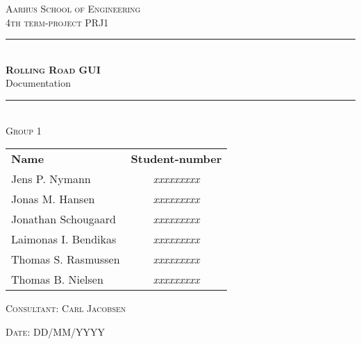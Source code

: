 \newcommand{\HRule}{\rule{\linewidth}{0.1mm}} %

\begin{center}
	
	\textsc{\LARGE Aarhus School of Engineering}\\[1.5cm] %
	
	\textsc{\large 4th term-project PRJ1}\\[2.5cm] 
	\HRule \\[0.8cm]
	{\huge \bfseries \textsc{Rolling Road GUI}} \\[0.5cm]{\LARGE Documentation} \\[0.4cm]
	\HRule \\[1.5cm]
	
	\textsc{\large Group 1}\\
	\vspace{0.5 in}
	\begin{center}
		\begin{tabular}{l c}
			\textbf{Name} & \textbf{Student-number} \\
			Jens P. Nymann & \textsl{xxxxxxxxx} \\
			Jonas M. Hansen & \textsl{xxxxxxxxx} \\
			Jonathan Schougaard & \textsl{xxxxxxxxx} \\
			Laimonas I. Bendikas & \textsl{xxxxxxxxx} \\
			Thomas S. Rasmussen & \textsl{xxxxxxxxx} \\
			Thomas B. Nielsen & \textsl{xxxxxxxxx} \\
		\end{tabular}
	\end{center}
	\vspace{0.5 in}
	
	\textsc{\large Consultant: Carl Jacobsen}
	\vspace{0.5 in}
	
	\textsc{\large Date: DD/MM/YYYY}\\
	
\end{center} %

\newpage